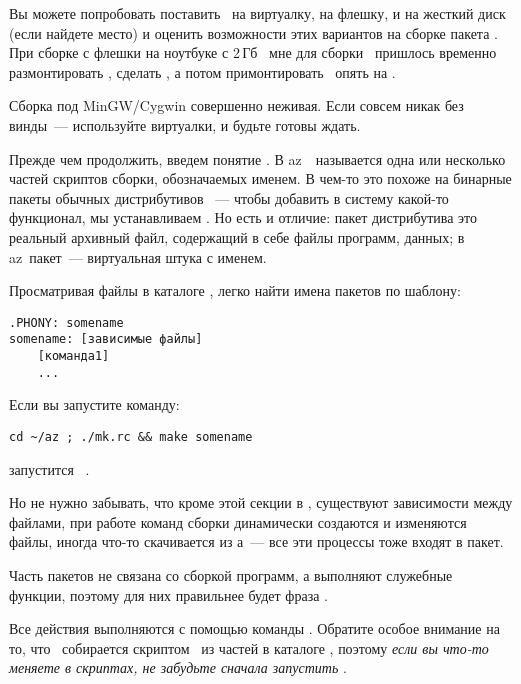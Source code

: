 Вы можете попробовать поставить \linux\ на виртуалку, на флешку, и на жесткий
диск (если найдете место) и оценить возможности этих вариантов на сборке пакета
. При сборке с флешки на ноутбуке с 2\,Гб \ram\ мне для сборки
\ пришлось временно размонтировать , сделать
, а потом примонтировать \
опять на .

Сборка под MinGW/Cygwin совершенно неживая. Если совсем никак без винды\ ---
используйте виртуалки, и будьте готовы ждать.


Прежде чем продолжить, введем понятие . В az\linux\ \
называется одна или несколько частей скриптов сборки, обозначаемых именем. В
чем-то это похоже на бинарные пакеты обычных дистрибутивов \linux\ --- чтобы
добавить в систему какой-то функционал, мы устанавливаем .
Но есть и отличие: пакет дистрибутива это реальный архивный файл, содержащий в
себе файлы программ, данных; в az\linux\ пакет\ --- виртуальная штука с именем.

Просматривая файлы в каталоге \file{mk/}, легко найти имена пакетов по шаблону:

\begin{verbatim}
.PHONY: somename
somename: [зависимые файлы]
    [команда1]
    ...
\end{verbatim}

Если вы запустите команду:

\begin{verbatim}
cd ~/az ; ./mk.rc && make somename
\end{verbatim}

запустится \ .

Но не нужно забывать, что кроме этой секции в , существуют зависимости
между файлами, при работе команд сборки динамически создаются и изменяются
файлы, иногда что-то скачивается из \internet а\ --- все эти процессы тоже
входят в пакет.

\bigskip
Часть пакетов не связана со сборкой программ, а выполняют служебные функции,
поэтому для них правильнее будет фраза .

\bigskip
Все действия выполняются с помощью команды . Обратите особое
внимание на то, что \ собирается скриптом \ из частей
в каталоге \file{mk/}, поэтому \emph{если вы что-то меняете в скриптах, не
забудьте сначала запустить \pack{./mk.rc}}.

